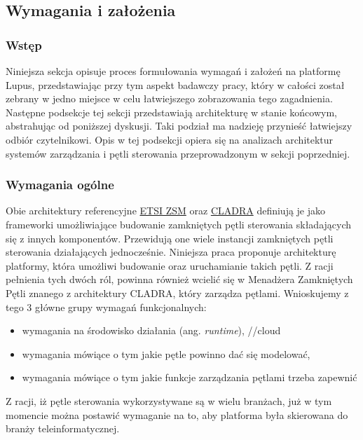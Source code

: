 \subsection{Wymagania i założenia}

\subsubsection{Wstęp}

Niniejsza sekcja opisuje proces formułowania wymagań i założeń na platformę Lupus, przedstawiając przy tym aspekt badawczy pracy, który w całości został zebrany w jedno miejsce w celu łatwiejszego zobrazowania tego zagadnienia. Następne podsekcje tej sekcji przedstawiają architekturę w stanie końcowym, abstrahując od poniższej dyskusji. Taki podział ma nadzieję przynieść łatwiejszy odbiór czytelnikowi. Opis w tej podsekcji opiera się na analizach architektur systemów zarządzania i pętli sterowania przeprowadzonym w sekcji poprzedniej.

\subsubsection{Wymagania ogólne}

Obie architektury referencyjne \hyperlink{sec:zsm}{ETSI ZSM} oraz \hyperlink{sec:cladra}{CLADRA} definiują je jako frameworki umożliwiające budowanie zamkniętych pętli sterowania składających się z innych komponentów. Przewidują one wiele instancji zamkniętych pętli sterowania działających jednocześnie. Niniejsza praca proponuje architekturę platformy, która umożliwi budowanie oraz uruchamianie takich pętli. Z racji pełnienia tych dwóch ról, powinna również wcielić się w Menadżera Zamkniętych Pętli znanego z architektury CLADRA, który zarządza pętlami. Wnioskujemy z tego 3 główne grupy wymagań funkcjonalnych:
\begin{itemize}
    \item wymagania na środowisko działania (ang. \textit{runtime}), //cloud
    \item wymagania mówiące o tym jakie pętle powinno dać się modelować,
    \item wymagania mówiące o tym jakie funkcje zarządzania pętlami trzeba zapewnić
\end{itemize}

Z racji, iż pętle sterowania wykorzystywane są w wielu branżach, już w tym momencie można postawić wymaganie na to, aby platforma była skierowana do branży teleinformatycznej. 

